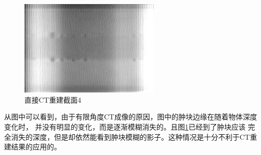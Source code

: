 \begin{figure}[!ht]\label{fig:origin4}
\center
\includegraphics[width=0.6\textwidth]{figure/result/origin4.jpg}
\caption{直接CT重建截面4}
\end{figure}

从图中可以看到，由于有限角度CT成像的原因，图中的肿块边缘在随着物体深度变化时，
并没有明显的变化，而是逐渐模糊消失的。且图\ref{fig:origin4}已经到了肿块应该
完全消失的深度，但是却依然能看到肿块模糊的影子。这种情况是十分不利于CT重建结果的应用的。

